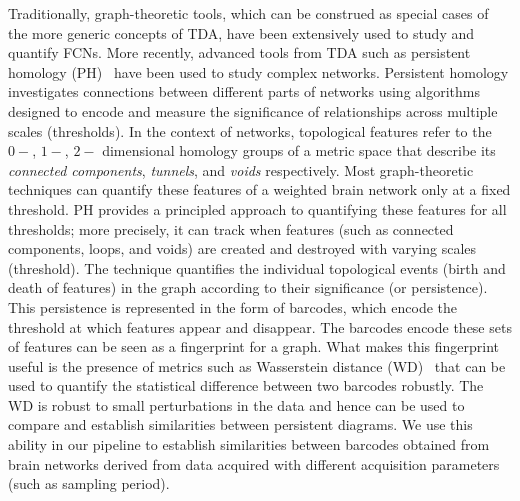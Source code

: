 Traditionally, graph-theoretic tools, which can be construed as special cases of the more generic concepts of TDA, have been extensively used to study and quantify FCNs. More recently, advanced tools from TDA such as persistent homology (PH)~\cite{rubinov2010complex} have been used to study complex networks. Persistent homology investigates connections between different parts of networks using algorithms designed to encode and measure the significance of relationships across multiple scales (thresholds). In the context of networks, topological features refer to the $0-$, $1-$, $2-$ dimensional homology groups of a metric space that describe its \emph{connected components}, \emph{tunnels}, and \emph{voids} respectively. Most graph-theoretic techniques can quantify these features of a weighted brain network only at a fixed threshold. PH provides a principled approach to quantifying these features for all thresholds; more precisely, it can track when features (such as connected components, loops, and voids) are created and destroyed with varying scales (threshold). The technique quantifies the individual topological events (birth and death of features) in the graph according to their significance (or persistence). This persistence is represented in the form of barcodes, which encode the threshold at which features appear and disappear. The barcodes encode these sets of features can be seen as a fingerprint for a graph. What makes this fingerprint useful is the presence of metrics such as Wasserstein distance (WD)~\cite{vallender1974calculation, edelsbrunner2013persistent} that can be used to quantify the statistical difference between two barcodes robustly. The WD is robust to small perturbations in the data and hence can be used to compare and establish similarities between persistent diagrams. We use this ability in our pipeline to establish similarities between barcodes obtained from brain networks derived from data acquired with different acquisition parameters (such as sampling period).


